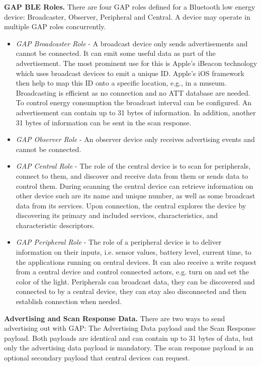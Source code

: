 \textbf{GAP BLE Roles.}
There are four GAP roles defined for a Bluetooth low energy device: Broadcaster, Observer, Peripheral and Central. A device may operate in multiple GAP roles concurrently.
\begin{itemize}
\item \emph{GAP Broadcaster Role} - A broadcast device only sends advertisements and cannot be connected. It can emit some useful data as part of the advertisement. The most prominent use for this is Apple's iBeacon technology which uses broadcast devices to emit a unique ID. Apple's iOS framework then help to map this ID onto a specific location, e.g., in a museum. Broadcasting is efficient as no connection and no ATT database are needed. To control energy consumption the broadcast interval can be configured. An advertisement can contain up to 31 bytes of information. In addition, another 31 bytes of information can be sent in the scan response.
\item \emph{GAP Observer Role} - An observer device only receives advertising events and cannot be connected. 
\item \emph{GAP Central Role} - The role of the central device is to scan for peripherals, connect to them, and discover and receive data from them or sends data to control them. During scanning the central device can retrieve information on other device such are its name and unique number, as well as some broadcast data from its services. Upon connection, the central explores the device by discovering its primary and included services, characteristics, and characteristic descriptors.
\item \emph{GAP Peripheral Role} - The role of a peripheral device is to deliver information on their inputs, i.e. sensor values, battery level, current time, to the applications running on central devices. It can also receive a write request from a central device and control connected actors, e.g. turn on and set the color of the light. Peripherals can broadcast data, they can be discovered and connected to by a central device, they can stay also disconnected and then establish connection when needed. 
\end{itemize} 

\textbf{Advertising and Scan Response Data.}
There are two ways to send advertising out with GAP: The Advertising Data payload and the Scan Response payload. Both payloads are identical and can contain up to 31 bytes of data, but only the advertising data payload is mandatory. The scan response payload is an optional secondary payload that central devices can request.

